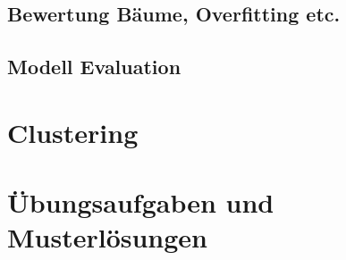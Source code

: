 \documentclass[a4paper]{article}
\begin{document}
\begin{landscape}
\begin{multicols}{3}
        \subsection{Bewertung Bäume, Overfitting etc.}
        
        \subsection{Modell Evaluation}

    \section{Clustering}
    
    
    \end{multicols}

    \newpage
    \section*{Übungsaufgaben und Musterlösungen}
\end{landscape}
\end{document}
